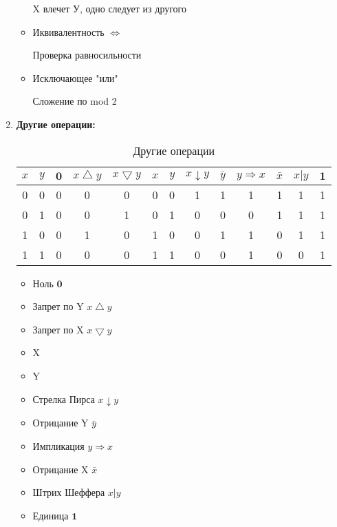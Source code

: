 \documentclass[a4paper,12pt]{article}
\begin{document}
\begin{enumerate}
\begin{itemize}
            X влечет У, одно следует из другого

            \item Иквивалентность $\Longleftrightarrow$

            Проверка равносильности

            \item Исключающее "или"

            Сложение по mod 2
        \end{itemize}

        \item \textbf{Другие операции:}

        \begin{table}[ht]
            \centering
            \begin{tabular}{|c|c|c|c|c|c|c|c|c|c|c|c|c|}
                \hline
                $x$ & $y$ & $\boldsymbol{0}$ & $x\bigtriangleup y$ & $x\bigtriangledown y$ & $x$ & $y$ & $x \downarrow y$ & $\bar y$ & $y \Longrightarrow x$ & $\bar x$& $x|y$ & $\boldsymbol{1}$   \\ \hline
                0 & 0 & 0 & 0 & 0 & 0 & 0 & 1 & 1 & 1 & 1 & 1 & 1 \\ \hline
                0 & 1 & 0 & 0 & 1 & 0 & 1 & 0 & 0 & 0 & 1 & 1 & 1 \\ \hline
                1 & 0 & 0 & 1 & 0 & 1 & 0 & 0 & 1 & 1 & 0 & 1 & 1 \\ \hline
                1 & 1 & 0 & 0 & 0 & 1 & 1 & 0 & 0 & 1 & 0 & 0 & 1 \\ \hline
            \end{tabular}
            \caption{Другие операции}
        \end{table}

        \begin{minipage}{0.4\textwidth}
            \begin{itemize}
                \item Ноль $\boldsymbol{0}$
                \item Запрет по Y $x\bigtriangleup y$
                \item Запрет по X $x\bigtriangledown y$
                \item X
                \item Y
                \item Стрелка Пирса $x \downarrow y$
            \end{itemize}
        \end{minipage}
        \hfill
        \begin{minipage}{0.4\textwidth}
            \begin{itemize}
                \item Отрицание Y $\bar y$
                \item Импликация $y \Longrightarrow x$
                \item Отрицание X $\bar x$
                \item Штрих Шеффера $x|y$
                \item Единица $\boldsymbol{1}$
            \end{itemize}
        \end{minipage}


\end{enumerate}
\end{document}
